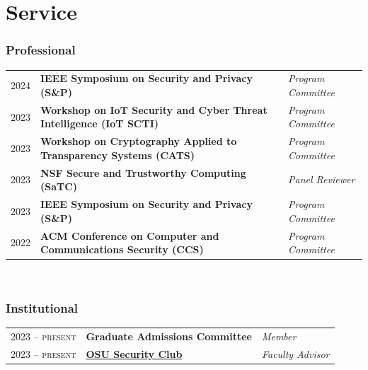 \documentclass[10pt,singlecolumn]{article} %
\begin{document}
\section{Service}

\subsubsection*{Professional}

\begin{tabular}{rll}
2024 & \textbf{IEEE Symposium on Security and Privacy (S\&P)} & \emph{Program Committee} \\ 
2023 & \textbf{Workshop on IoT Security and Cyber Threat Intelligence (IoT SCTI)} & \emph{Program Committee} \\
2023 & \textbf{Workshop on Cryptography Applied to Transparency Systems (CATS)} & \emph{Program Committee} \\ 
2023 & \textbf{NSF Secure and Trustworthy Computing (SaTC)} & \emph{Panel Reviewer} \\
2023 & \textbf{IEEE Symposium on Security and Privacy (S\&P)} & \emph{Program Committee} \\ 
2022 & \textbf{ACM Conference on Computer and Communications Security (CCS)} & \emph{Program Committee} \\
\end{tabular} \\

\subsubsection*{Institutional}

\begin{tabular}{rll}
2023 -- \textsc{present} & \textbf{Graduate Admissions Committee} & \emph{Member} \\
2023 -- \textsc{present} & \textbf{\href{https://osusec.org/}{OSU Security Club}} & \emph{Faculty Advisor} \\
\end{tabular} \\
\end{document}

